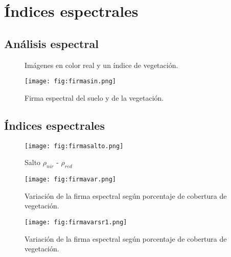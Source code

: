 \section{Índices espectrales}
\subsection{Análisis espectral}

\begin{frame}{}
  \begin{figure}
    \centering
    \hspace{1cm}
    \caption{Imágenes en color real y un índice de vegetación.}
    \label{}
  \end{figure}
\end{frame}

\begin{frame}{}
  \begin{figure}
    \centering
    \texttt{[image: fig:firmasin.png]}
    \caption{Firma espectral del suelo y de la vegetación.}
    \label{}
  \end{figure}
\end{frame}
\subsection{Índices espectrales}

\begin{frame}{}
  \begin{figure}
    \centering
    \texttt{[image: fig:firmasalto.png]}
    \caption{Salto $\rho_{nir}$ - $\rho_{red}$}
    \label{}
  \end{figure}
\end{frame}


\begin{frame}{}
  \begin{figure}
    \centering
    \texttt{[image: fig:firmavar.png]}
    \caption{Variación de la firma espectral según porcentaje de cobertura de vegetación.}
    \label{}
  \end{figure}
\end{frame}



\begin{frame}{}
  \begin{figure}
    \centering
    \texttt{[image: fig:firmavarsr1.png]}
    \caption{Variación de la firma espectral según porcentaje de cobertura de vegetación.}
    \label{}
  \end{figure}
\end{frame}

